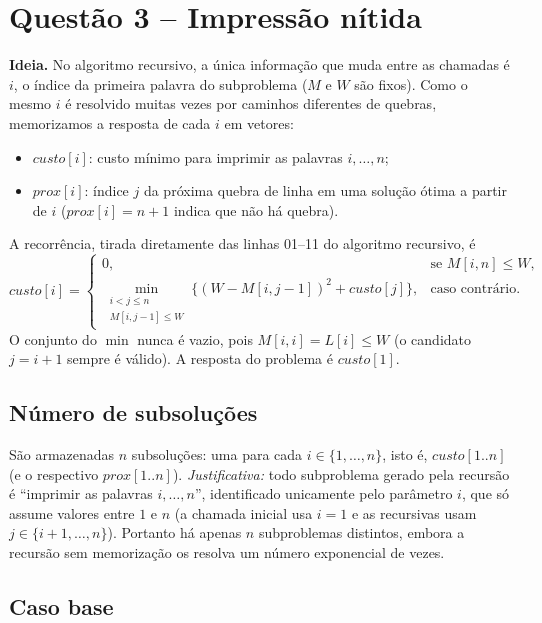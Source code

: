 \documentclass[11pt,a4paper]{article}
\begin{document}
\section*{Questão 3 -- Impressão nítida}
\setcounter{lema}{0}\setcounter{teorema}{0}
\noindent\textbf{Ideia.} No algoritmo recursivo, a única informação que muda entre
as chamadas é $i$, o índice da primeira palavra do subproblema ($M$ e $W$ são
fixos). Como o mesmo $i$ é resolvido muitas vezes por caminhos diferentes de quebras,
memorizamos a resposta de cada $i$ em vetores:
\begin{itemize}
  \item $\mathit{custo}[i]$: custo mínimo para imprimir as palavras $i,\dots,n$;
  \item $\mathit{prox}[i]$: índice $j$ da próxima quebra de linha em uma solução
        ótima a partir de $i$ ($\mathit{prox}[i]=n+1$ indica que não há quebra).
\end{itemize}
A recorrência, tirada diretamente das linhas 01--11 do algoritmo recursivo, é
\[
\mathit{custo}[i] =
\begin{cases}
0, & \text{se } M[i,n] \le W,\\[2pt]
\displaystyle\min_{\substack{i < j \le n\\ M[i,j-1]\le W}}
  \Big\{ (W - M[i,j-1])^2 + \mathit{custo}[j] \Big\}, & \text{caso contrário.}
\end{cases}
\]
O conjunto do $\min$ nunca é vazio, pois $M[i,i]=L[i]\le W$ (o candidato $j=i+1$
sempre é válido). A resposta do problema é $\mathit{custo}[1]$.

\subsection{Número de subsoluções}

São armazenadas $n$ subsoluções: uma para cada $i \in \{1,\dots,n\}$, isto é,
$\mathit{custo}[1..n]$ (e o respectivo $\mathit{prox}[1..n]$).
\emph{Justificativa:} todo subproblema gerado pela recursão é ``imprimir as palavras
$i,\dots,n$'', identificado unicamente pelo parâmetro $i$, que só assume valores entre
$1$ e $n$ (a chamada inicial usa $i=1$ e as recursivas usam $j\in\{i+1,\dots,n\}$).
Portanto há apenas $n$ subproblemas distintos, embora a recursão sem memorização os
resolva um número exponencial de vezes.

\subsection{Caso base}
\end{document}
